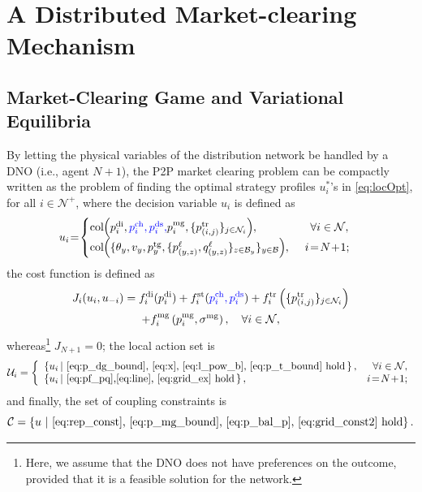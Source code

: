 \documentclass{IEEEtran}  %
\newtheorem{definition}{Definition}
\newcommand{\mc}{\mathcal}
\newcommand{\col}{\operatorname{col}}
\newcommand{\0}{\mathbf{0}}
\newcommand{\1}{\mathbf{1}}
\newcommand{\edit}[1]{\color{blue}{#1}\color{black}}
\begin{document}
\section{A Distributed Market-clearing Mechanism}
\label{sub:alg}
\subsection{Market-Clearing Game and Variational Equilibria}
By letting the physical variables of the distribution network be handled by a DNO (i.e., agent $N\!+\!1$), the P2P market clearing problem can be compactly written as the problem of finding the optimal strategy profiles $u_i^*$'s in \eqref{eq:locOpt}, for all $i \in \mc N^+$, where the decision variable $u_i$ is defined as
$$u_i \hspace{-2pt} = \hspace{-2pt}\begin{cases} \col\hspace{-2pt}\left(p_{i}^{\mathrm{di}},\edit{p_{i}^{\mathrm{ch}},p_{i}^{\mathrm{ds}}, } p_{i}^{\mathrm{mg}},\{p_{(i,j)}^{\mathrm {tr}}\}_{j\in \mc N_i}\right)\hspace{-2pt}, \ \qquad \qquad \;  \forall  i \in \mc N,\\
	\col\hspace{-2pt}\left(\{\theta_y, v_y, p_y^{\mathrm{tg}},\{p_{(y,z)}^{\ell},q_{(y,z)}^{\ell}\}_{z \in \mc B_y} \}_{y\in\mc B} \right)\hspace{-2pt},  \; \quad i\!=\! N\!+\!1;
		\end{cases}$$ 
the cost function is defined as
	\begin{multline}
	J_i(u_i,u_{-i}) =
f_{i}^{\mathrm{di}}(p_{i}^{\mathrm{di}}) + f_{i}^{\mathrm{st}}(\edit{p_{i}^{\mathrm{ch}},p_{i}^{\mathrm{ds}}})+ f_{i}^{\mathrm{tr}} \left( \{ p_{(i,j)}^{\mathrm{tr}} \}_{j \in \mc N_i} \right)\\
    + f_{i}^{\mathrm{mg}}\left( p_{i}^{\mathrm{mg}},\sigma^{\textrm{mg}} \right), \quad \forall  i \in \mc N,
 \label{eq:cost_def}
	\end{multline}
whereas\footnote{Here, we assume that the DNO does not have preferences on the outcome, provided that it is a feasible solution for the network.} $J_{N+1}=0$; the local action set is
\begin{align}
\label{eq:constr_def}
\mc U_i =
\left\{
\begin{array}{l r}
\left\{u_i \,|~ \text{\eqref{eq:p_dg_bound}, \eqref{eq:x}, \eqref{eq:l_pow_b}, \eqref{eq:p_t_bound} hold} \, \right\}, & \forall i \in \mc N, \\
\left\{ u_i \,|~ \text{\eqref{eq:pf_pq},\eqref{eq:line}, \eqref{eq:grid_ex} hold} \,\right\}, & i\!=\!N\!+\!1;
\end{array}
\right.
\end{align}
and finally, the set of coupling constraints is 
\begin{equation}
\label{eq:Cconstr_def}
\mc C = \left\{
u~|~ \text{\eqref{eq:rep_const}, \eqref{eq:p_mg_bound}, \eqref{eq:p_bal_p}, \eqref{eq:grid_const2} hold}
\right\}.
\end{equation}
\end{document}
